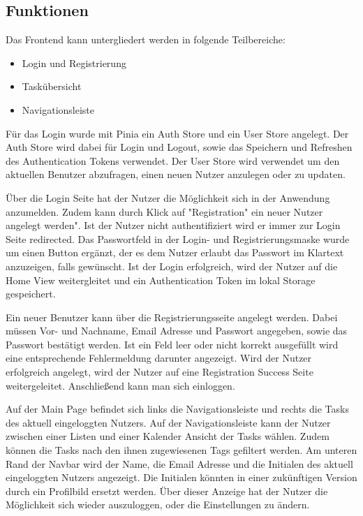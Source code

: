 \documentclass[a4paper, 12pt]{article}
\begin{document}
    \subsection{Funktionen}
    Das Frontend kann untergliedert werden in folgende Teilbereiche:

    \begin{itemize}
        \item Login und Registrierung
        \item Taskübersicht
        \item Navigationsleiste
    \end{itemize}

    Für das Login wurde mit Pinia ein Auth Store und ein User Store angelegt. Der Auth Store wird dabei für Login und Logout, sowie das Speichern und Refreshen des Authentication Tokens verwendet.
    Der User Store wird verwendet um den aktuellen Benutzer abzufragen, einen neuen Nutzer anzulegen oder zu updaten.
    
    Über die Login Seite hat der Nutzer die Möglichkeit sich in der Anwendung anzumelden. Zudem kann durch Klick auf "Registration" ein neuer Nutzer angelegt werden". Ist der Nutzer nicht authentifiziert wird
    er immer zur Login Seite redirected. Das Passwortfeld in der Login- und Registrierungsmaske wurde um einen Button ergänzt, der es dem Nutzer erlaubt das Passwort im Klartext anzuzeigen, falls gewünscht.
    Ist der Login erfolgreich, wird der Nutzer auf die Home View weitergleitet und ein Authentication Token im lokal Storage gespeichert.

    Ein neuer Benutzer kann über die Registrierungsseite angelegt werden. Dabei müssen Vor- und Nachname, Email Adresse und Passwort angegeben, sowie das Passwort bestätigt werden. Ist ein Feld leer oder nicht korrekt ausgefüllt
    wird eine entsprechende Fehlermeldung darunter angezeigt. Wird der Nutzer erfolgreich angelegt, wird der Nutzer auf eine Registration Success Seite weitergeleitet. Anschließend kann man sich einloggen.

    Auf der Main Page befindet sich links die Navigationsleiste und rechts die Tasks des aktuell eingeloggten Nutzers. Auf der Navigationsleiste kann der Nutzer zwischen einer Listen und einer Kalender Ansicht der Tasks wählen.
    Zudem können die Tasks nach den ihnen zugewiesenen Tags gefiltert werden. Am unteren Rand der Navbar wird der Name, die Email Adresse und die Initialen des aktuell eingeloggten Nutzers angezeigt.
    Die Initialen könnten in einer zukünftigen Version durch ein Profilbild ersetzt werden.
    Über dieser Anzeige hat der Nutzer die Möglichkeit sich wieder auszuloggen, oder die Einstellungen zu ändern.
\end{document}
